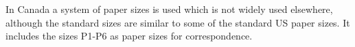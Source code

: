 In Canada a system of paper sizes is used which is not widely used elsewhere, 
although the standard sizes are similar to some of the standard US paper sizes.
It includes the sizes P1-P6 as paper sizes for correspondence.